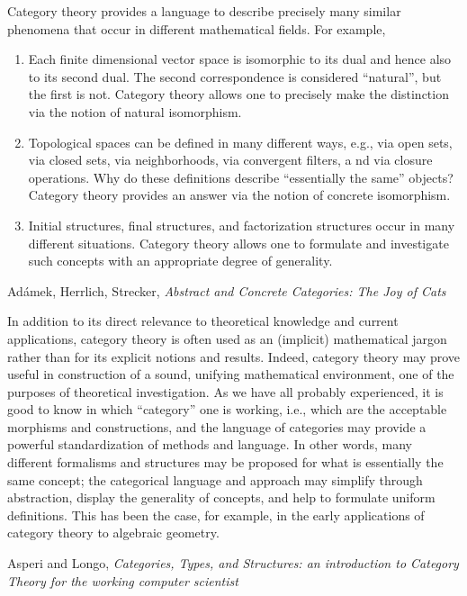 \documentclass[11pt]{book}
\begin{document}
\epigraph{Category theory provides a language 
to describe precisely many similar phenomena that
occur in different mathematical fields. For example,
\begin{enumerate}
  \item  Each finite dimensional vector space is 
  isomorphic to its dual and hence also to its
second dual. The second correspondence is considered 
``natural'', but the first is
not. Category theory allows one to precisely 
make the distinction via the notion
of natural isomorphism.
\item Topological spaces can be defined in many different ways, 
e.g., via open sets, via
closed sets, via neighborhoods, via convergent filters, a
nd via closure operations.
Why do these definitions describe 
``essentially the same'' objects? Category theory
provides an answer via the notion of concrete isomorphism.
\item Initial structures, final structures, 
and factorization structures occur in many different
situations. Category theory allows one to formulate 
and investigate such
concepts with an appropriate degree of generality.
\end{enumerate}
\leavevmode }
{Ad\'{a}mek, Herrlich, Strecker, 
\textit{Abstract and Concrete Categories:
The Joy of Cats}~\cite{adamek_herrlich_strecker_1990}}

\pagebreak

\epigraph{In addition to its direct relevance to theoretical knowledge and current applications, category theory
is often used as an (implicit) mathematical jargon rather than for its explicit notions and results.
Indeed, category theory may prove useful in construction of a sound, unifying mathematical
environment, one of the purposes of theoretical investigation. As we have all probably experienced, it
is good to know in which ``category'' one is working, i.e., which are the acceptable morphisms and
constructions, and the language of categories may provide a powerful standardization of methods and
language. In other words, many different formalisms and structures may be proposed for what is
essentially the same concept; the categorical language and approach may simplify through abstraction,
display the generality of concepts, and help to formulate uniform definitions. This has been the case,
for example, in the early applications of category theory to algebraic geometry.}
{Asperi and Longo, \textit{Categories, Types, and Structures: 
an introduction to Category Theory for the working computer scientist}~\cite{asperti_longo_1991}}
\end{document}
